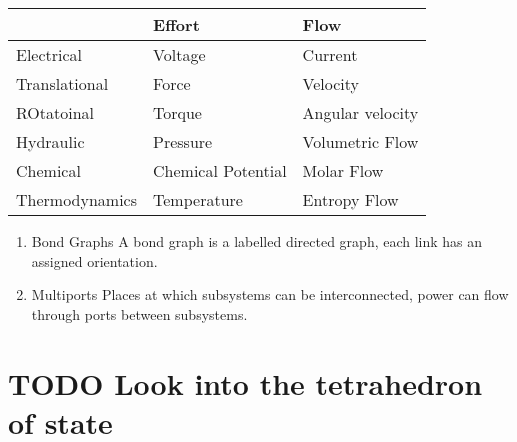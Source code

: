 \documentclass[11pt]{report}
\begin{document}
\begin{center}
\begin{tabular}{lll}
\hline
 & Effort & Flow\\
\hline
Electrical & Voltage & Current\\
Translational & Force & Velocity\\
ROtatoinal & Torque & Angular velocity\\
Hydraulic & Pressure & Volumetric Flow\\
Chemical & Chemical Potential & Molar Flow\\
Thermodynamics & Temperature & Entropy Flow\\
\hline
\end{tabular}
\end{center}
\begin{enumerate}
\item Bond Graphs
\label{sec:org32991ee}
A bond graph is a labelled directed graph, each link has an assigned orientation.
\item Multiports
\label{sec:org1a9dc51}
Places at which subsystems can be interconnected, power can flow through ports between subsystems.
\end{enumerate}
\section{{\bfseries\sffamily TODO} Look into the tetrahedron of state}
\label{sec:orgc45a49b}
\end{document}
